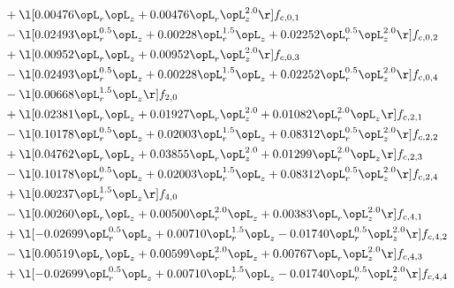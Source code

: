 \begin{alignat}{2}
& + \l[  0.00476 \opL_r \opL_z +  0.00476 \opL_r \opL_z^{2.0}  \r] f_{c,0,1} \nonumber \\ 
& - \l[  0.02493 \opL_r^{0.5} \opL_z +  0.00228 \opL_r^{1.5} \opL_z +  0.02252 \opL_r^{0.5} \opL_z^{2.0}  \r] f_{c,0,2} \nonumber \\ 
& + \l[  0.00952 \opL_r \opL_z +  0.00952 \opL_r \opL_z^{2.0}  \r] f_{c,0,3} \nonumber \\ 
& - \l[  0.02493 \opL_r^{0.5} \opL_z +  0.00228 \opL_r^{1.5} \opL_z +  0.02252 \opL_r^{0.5} \opL_z^{2.0}  \r] f_{c,0,4} \nonumber \\ 
& - \l[  0.00668 \opL_r^{1.5} \opL_z  \r] f_{2,0} \nonumber \\ 
& + \l[  0.02381 \opL_r \opL_z +  0.01927 \opL_r \opL_z^{2.0} +  0.01082 \opL_r^{2.0} \opL_z  \r] f_{c,2,1} \nonumber \\ 
& - \l[  0.10178 \opL_r^{0.5} \opL_z +  0.02003 \opL_r^{1.5} \opL_z +  0.08312 \opL_r^{0.5} \opL_z^{2.0}  \r] f_{c,2,2} \nonumber \\ 
& + \l[  0.04762 \opL_r \opL_z +  0.03855 \opL_r \opL_z^{2.0} +  0.01299 \opL_r^{2.0} \opL_z  \r] f_{c,2,3} \nonumber \\ 
& - \l[  0.10178 \opL_r^{0.5} \opL_z +  0.02003 \opL_r^{1.5} \opL_z +  0.08312 \opL_r^{0.5} \opL_z^{2.0}  \r] f_{c,2,4} \nonumber \\ 
& + \l[  0.00237 \opL_r^{1.5} \opL_z  \r] f_{4,0} \nonumber \\ 
& - \l[  0.00260 \opL_r \opL_z +  0.00500 \opL_r^{2.0} \opL_z +  0.00383 \opL_r \opL_z^{2.0}  \r] f_{c,4,1} \nonumber \\ 
& + \l[  -0.02699 \opL_r^{0.5} \opL_z +  0.00710 \opL_r^{1.5} \opL_z   -0.01740 \opL_r^{0.5} \opL_z^{2.0}  \r] f_{c,4,2} \nonumber \\ 
& - \l[  0.00519 \opL_r \opL_z +  0.00599 \opL_r^{2.0} \opL_z +  0.00767 \opL_r \opL_z^{2.0}  \r] f_{c,4,3} \nonumber \\ 
& + \l[  -0.02699 \opL_r^{0.5} \opL_z +  0.00710 \opL_r^{1.5} \opL_z   -0.01740 \opL_r^{0.5} \opL_z^{2.0}  \r] f_{c,4,4} \nonumber \\ 
\end{alignat} 


